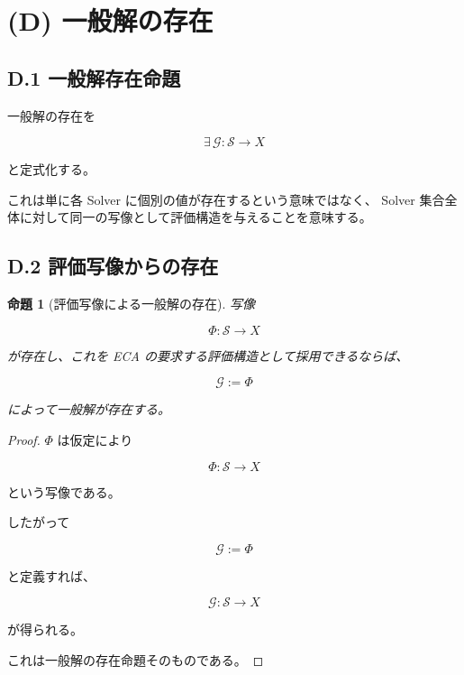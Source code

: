 \documentclass[a4paper,11pt]{article}
\newtheorem{proposition}[definition]{命題}
\newcommand{\Solver}{\mathcal{S}}
\newcommand{\Eval}{\mathcal{G}}
\begin{document}
\section{(D) 一般解の存在}

\subsection{D.1 一般解存在命題}

一般解の存在を

\begin{equation}
    \exists\,
    \Eval:\Solver\to X
\end{equation}

と定式化する。

これは単に各 Solver に個別の値が存在するという意味ではなく、
Solver 集合全体に対して同一の写像として評価構造を与えることを意味する。


\subsection{D.2 評価写像からの存在}

\begin{proposition}[評価写像による一般解の存在]
写像

\begin{equation}
    \Phi:\Solver\to X
\end{equation}

が存在し、これを ECA の要求する評価構造として採用できるならば、

\begin{equation}
    \Eval:=\Phi
\end{equation}

によって一般解が存在する。
\end{proposition}

\begin{proof}
$\Phi$ は仮定により

\begin{equation}
    \Phi:\Solver\to X
\end{equation}

という写像である。

したがって

\begin{equation}
    \Eval:=\Phi
\end{equation}

と定義すれば、

\begin{equation}
    \Eval:\Solver\to X
\end{equation}

が得られる。

これは一般解の存在命題そのものである。
\end{proof}
\end{document}

